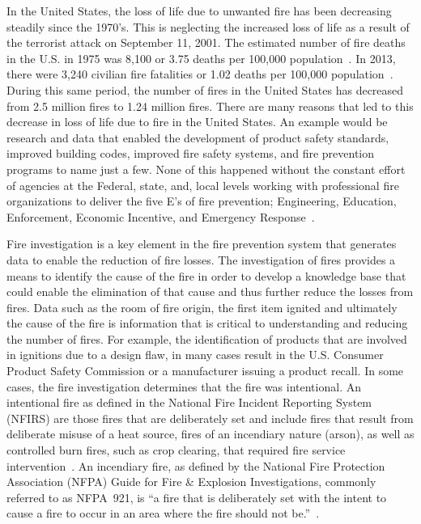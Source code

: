 \documentclass[twoside]{uocthesis}
\begin{document}
In the United States, the loss of life due to unwanted fire has been decreasing steadily since the 1970’s.  This is neglecting the increased loss of life as a result of the terrorist attack on September 11, 2001.  The estimated number of fire deaths in the U.S. in 1975 was 8,100 or 3.75 deaths per 100,000 population~\cite{America_Burning_Revisited}.  In 2013, there were 3,240 civilian fire fatalities or 1.02 deaths per 100,000 population~\cite{Karter:2014}.  During this same period, the number of fires in the United States has decreased from 2.5 million fires to 1.24 million fires.  There are many reasons that led to this decrease in loss of life due to fire in the United States.  An example would be research and data that enabled the development of product safety standards, improved building codes, improved fire safety systems, and fire prevention programs to name just a few.  None of this happened without the constant effort of agencies at the Federal, state, and, local levels working with professional fire organizations to deliver the five E’s of fire prevention; Engineering, Education, Enforcement, Economic Incentive, and Emergency Response~\cite{FIVE}.

Fire investigation is a key element in the fire prevention system that generates data to enable the reduction of fire losses.  The investigation of fires provides a means to identify the cause of the fire in order to develop a knowledge base that could enable the elimination of that cause and thus further reduce the losses from fires.  Data such as the room of fire origin, the first item ignited and ultimately the cause of the fire is information that is critical to understanding and reducing the number of fires.  For example, the identification of products that are involved in ignitions due to a design flaw, in many cases result in the U.S. Consumer Product Safety Commission or a manufacturer issuing a product recall.
In some cases, the fire investigation determines that the fire was intentional.  An intentional fire as defined in the National Fire Incident Reporting System (NFIRS)  are those fires that are deliberately set and include fires that result from deliberate misuse of a heat source, fires of an incendiary nature (arson), as well as controlled burn fires, such as crop clearing, that required fire service intervention~\cite{Campbell:2014}.  An incendiary fire, as defined by the National Fire Protection Association (NFPA) Guide for Fire \& Explosion Investigations, commonly referred to as NFPA~921, is ``a fire that is deliberately set with the intent to cause a fire to occur in an area where the fire should not be.''~\cite{NFPA_921}.
\end{document}
